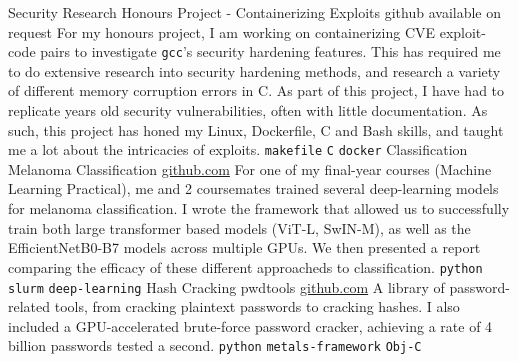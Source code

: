 \documentclass[9pt]{developercv} %
\begin{document}
\vspace{-20 pt}
\begin{entrylist}
 	\entry
		{Security Research}
		{Honours Project - Containerizing Exploits}
    {github available on request}
		{
      For my honours project, I am working on containerizing CVE exploit-code pairs to investigate \texttt{gcc}'s security hardening features.      This has required me to do extensive research into security hardening methods, and research a variety of different memory corruption errors in C. 
      As part of this project, I have had to replicate years old security vulnerabilities, often with little documentation. 
      As such, this project has honed my Linux, Dockerfile, C and Bash skills, and taught me a lot about the intricacies of exploits.
			\newline
      \texttt{makefile} \slashsep \texttt{C} \slashsep \texttt{docker}
		}  
    \entry
		{Classification}
		{Melanoma Classification}
		{\href{https://github.com/JacobInwald/mlp}{github.com}}
		{
      For one of my final-year courses (Machine Learning Practical), me and 2 coursemates trained several deep-learning models for melanoma classification. 
      I wrote the framework that allowed us to successfully train both large transformer based models (ViT-L, SwIN-M), as well as the EfficientNetB0-B7 models across multiple GPUs. 
      We then presented a report comparing the efficacy of these different approacheds to classification.
			\newline
			\texttt{python}  \slashsep \texttt{slurm} \slashsep \texttt{deep-learning}
		}
    \entry
		{Hash Cracking}
		{pwdtools}
		{\href{https://github.com/JacobInwald/pwdtools}{github.com}}
		{
			A library of password-related tools, from cracking plaintext passwords to cracking hashes. 
			I also included a GPU-accelerated brute-force password cracker, achieving a rate of 4 billion passwords tested a second. 
			\newline
			\texttt{python} \slashsep \texttt{metals-framework} \slashsep \texttt{Obj-C}
		}

\end{entrylist}
\end{document}
